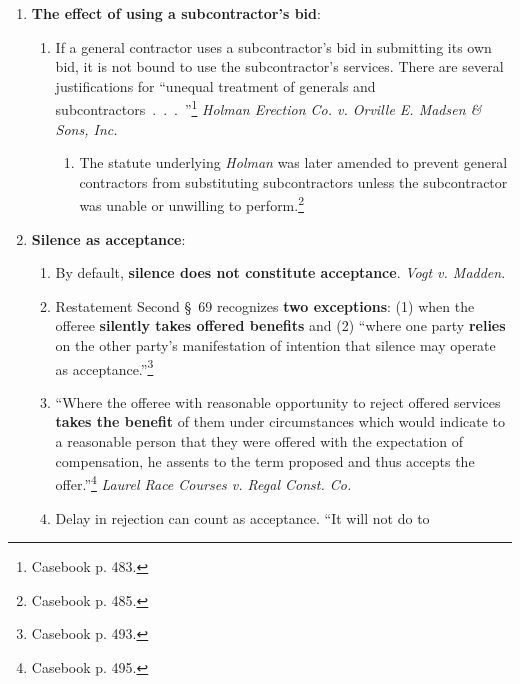 \begin{enumerate}
\begin{enumerate}
        services without expressing any objections to the offer's essential 
        terms, the offeree has manifested assent to those 
        terms.''\footnote{Casebook p. 478.} \emph{Polaroid Corp. v. Rollins 
        Environmental Services (NJ), Inc.}
    \end{enumerate}
    \item \textbf{The effect of using a subcontractor's bid}:
    \begin{enumerate}
        \item If a general contractor uses a subcontractor's bid in submitting 
        its own bid, it is not bound to use the subcontractor's services. 
        There are several justifications for ``unequal treatment of generals 
        and subcontractors~.~.~.~''\footnote{Casebook p. 483.} \emph{Holman 
        Erection Co. v. Orville E. Madsen \& Sons, Inc.}
        \begin{enumerate}
            \item The statute underlying \emph{Holman} was later amended to 
            prevent general contractors from substituting subcontractors 
            unless the subcontractor was unable or unwilling to 
            perform.\footnote{Casebook p.  485.}
        \end{enumerate}
    \end{enumerate}
    \item \textbf{Silence as acceptance}:
    \begin{enumerate}
        \item By default, \textbf{silence does not constitute acceptance}. 
        \emph{Vogt v. Madden}.
        \item Restatement Second \S\ 69 recognizes \textbf{two exceptions}: 
        (1) when the offeree \textbf{silently takes offered benefits} and (2) 
        ``where one party \textbf{relies} on the other party's manifestation 
        of intention that silence may operate as 
        acceptance.''\footnote{Casebook p. 493.}
        \item ``Where the offeree with reasonable opportunity to reject 
        offered services \textbf{takes the benefit} of them under 
        circumstances which would indicate to a reasonable person that they 
        were offered with the expectation of compensation, he assents to the 
        term proposed and thus accepts the offer.''\footnote{Casebook p. 495.} 
        \emph{Laurel Race Courses v. Regal Const. Co.}
        \item Delay in rejection can count as acceptance. ``It will not do to 

\end{enumerate}
\end{enumerate}
